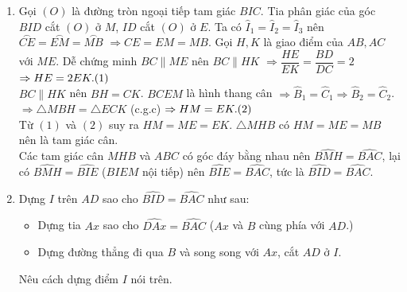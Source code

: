 \begin{bt}
{		\begin{enumerate}
			\item  Gọi $(O)$ là đường tròn ngoại tiếp tam giác $BIC$. Tia phân giác của góc $BID$ cắt $(O)$ ở $M$, $ID$ cắt $(O)$ ở $E$. Ta có $\widehat{I}_1=\widehat{I}_2 = \widehat{I}_3$ nên $\overset{\frown}{CE}=\overset{\frown}{EM}=\overset{\frown}{MB}$ $\Rightarrow CE = EM = MB$. Gọi $H,K$ là giao điểm của $AB,AC$ với $ME$. Dễ chứng minh $BC \parallel ME$ nên $BC \parallel HK$ $\Rightarrow \dfrac{HE}{EK} = \dfrac{BD}{DC} =2$ $\Rightarrow HE = 2EK. \hfill (1)$\\
			$BC \parallel HK$ nên $BH = CK$. $BCEM$ là hình thang cân $\Rightarrow \widehat{B}_1 = \widehat{C}_1 \Rightarrow \widehat{B}_2 = \widehat{C}_2$.\\
			$\Rightarrow \triangle MBH = \triangle ECK$ (c.g.c) $\Rightarrow HM = EK. \hfill (2)$\\
			Từ $(1)$ và $(2)$  suy ra $HM = ME = EK$. $\triangle MHB$ có $HM = ME = MB$ nên là tam giác cân.\\
			Các tam giác cân $MHB$ và $ABC$ có góc đáy bằng nhau nên $\widehat{BMH}=\widehat{BAC}$, lại có $\widehat{BMH} = \widehat{BIE}$ ($BIEM$ nội tiếp) nên $\widehat{BIE} = \widehat{BAC}$, tức là  $\widehat{BID} = \widehat{BAC}$.
			\item Dựng $I$ trên $AD$ sao cho   $\widehat{BID} = \widehat{BAC}$ như sau:
			\begin{itemize}
				\item  Dựng tia $Ax$ sao cho $\widehat{DAx} = \widehat{BAC}$ ($Ax$ và $B$ cùng phía với $AD$.)
				\item Dựng đường thẳng đi qua $B$ và song song với $Ax$, cắt $AD$ ở $I$.
			\end{itemize}
			Nêu cách dựng điểm $I$ nói trên.
		\end{enumerate}
		
	}
\end{bt}
